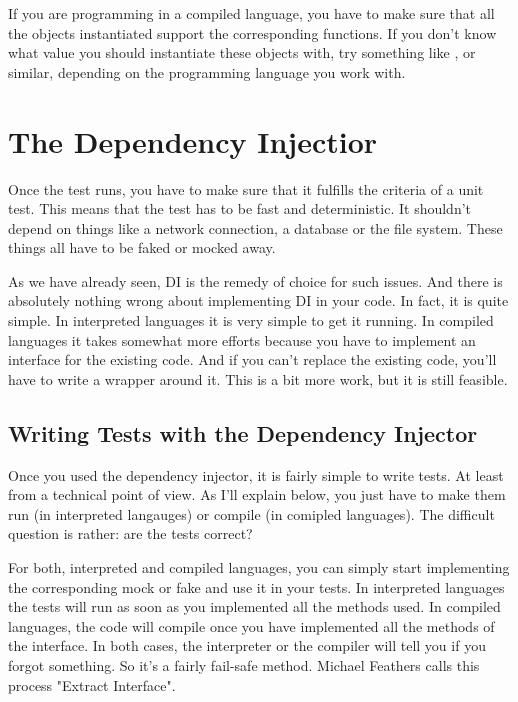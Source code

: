 If you are programming in a compiled language, you have to make sure that all the objects instantiated support the corresponding functions. If you don't know what value you should instantiate these objects with, try something like ,  or similar, depending on the programming language you work with.

\section{The Dependency Injectior}\label{sec:dependency_injector}

Once the test runs, you have to make sure that it fulfills the criteria of a unit test. This means that the test has to be fast and deterministic. It shouldn't depend on things like a network connection, a database or the file system. These things all have to be faked or mocked away.

As we have already seen, DI is the remedy of choice for such issues. And there is absolutely nothing wrong about implementing DI in your code. In fact, it is quite simple. In interpreted languages it is very simple to get it running. In compiled languages it takes somewhat more efforts because you have to implement an interface for the existing code. And if you can't replace the existing code, you'll have to write a wrapper around it. This is a bit more work, but it is still feasible. 

\subsection{Writing Tests with the Dependency Injector}

Once you used the dependency injector, it is fairly simple to write tests. At least from a technical point of view. As I'll explain below, you just have to make them run (in interpreted langauges) or compile (in comipled languages). The difficult question is rather: are the tests correct?

For both, interpreted and compiled languages, you can simply start implementing the corresponding mock or fake and use it in your tests. In interpreted languages the tests will run as soon as you implemented all the methods used. In compiled languages, the code will compile once you have implemented all the methods of the interface. In both cases, the interpreter or the compiler will tell you if you forgot something. So it's a fairly fail-safe method. Michael Feathers calls this process "Extract Interface".


